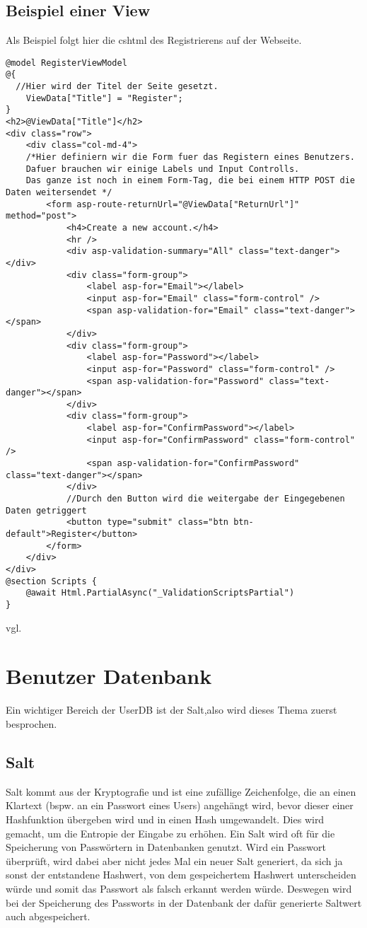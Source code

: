 {\subsection{Beispiel einer View}
\label{mvc_view_beispiel}
Als Beispiel folgt hier die cshtml des Registrierens auf der Webseite.
\begin{lstlisting}
@model RegisterViewModel
@{
  //Hier wird der Titel der Seite gesetzt.
    ViewData["Title"] = "Register";
}
<h2>@ViewData["Title"]</h2>
<div class="row">
    <div class="col-md-4">
    /*Hier definiern wir die Form fuer das Registern eines Benutzers.
    Dafuer brauchen wir einige Labels und Input Controlls. 
    Das ganze ist noch in einem Form-Tag, die bei einem HTTP POST die Daten weitersendet */
        <form asp-route-returnUrl="@ViewData["ReturnUrl"]" method="post">
            <h4>Create a new account.</h4>
            <hr />
            <div asp-validation-summary="All" class="text-danger"></div>
            <div class="form-group">
                <label asp-for="Email"></label>
                <input asp-for="Email" class="form-control" />
                <span asp-validation-for="Email" class="text-danger"></span>
            </div>
            <div class="form-group">
                <label asp-for="Password"></label>
                <input asp-for="Password" class="form-control" />
                <span asp-validation-for="Password" class="text-danger"></span>
            </div>
            <div class="form-group">
                <label asp-for="ConfirmPassword"></label>
                <input asp-for="ConfirmPassword" class="form-control" />
                <span asp-validation-for="ConfirmPassword" class="text-danger"></span>
            </div>
            //Durch den Button wird die weitergabe der Eingegebenen Daten getriggert
            <button type="submit" class="btn btn-default">Register</button>
        </form>
    </div>
</div>
@section Scripts {
    @await Html.PartialAsync("_ValidationScriptsPartial")
}
\end{lstlisting}
vgl. \textcite{mic_views}
\section{Benutzer Datenbank}
\label{sec:UserDB}
Ein wichtiger Bereich der UserDB ist der Salt,also wird dieses Thema zuerst besprochen.
\subsection{Salt}
\label{sec:salt}
Salt kommt aus der Kryptografie und ist eine zufällige Zeichenfolge, die an einen Klartext (bspw. an ein Passwort eines Users) angehängt wird, bevor dieser einer Hashfunktion übergeben wird und in einen Hash umgewandelt. Dies wird gemacht, um die Entropie der Eingabe zu erhöhen. Ein Salt wird oft für die Speicherung von Passwörtern in Datenbanken genutzt. Wird ein Passwort überprüft, wird dabei aber nicht jedes Mal ein neuer Salt generiert, da sich ja sonst der entstandene Hashwert, von dem gespeichertem Hashwert unterscheiden würde und somit das Passwort als falsch erkannt werden würde. Deswegen wird bei der Speicherung des Passworts in der Datenbank der dafür generierte Saltwert auch abgespeichert.
}
